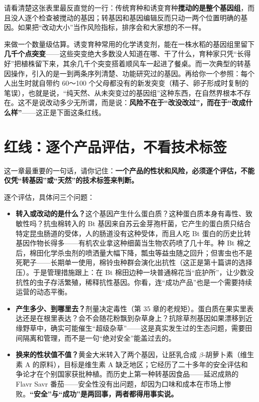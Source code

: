 请看清楚这张表里最反直觉的一行：传统育种和诱变育种\textbf{搅动的是整个基因组}，而且没人逐个检查被搅动的基因；转基因和基因编辑反而只动一两个位置明确的基因。如果把“改动大小”当作风险指标，排序会和大家想的不一样。

\begin{qiaoliang}
来做一个数量级估算。诱变育种常用的化学诱变剂，能在一株水稻的基因组里留下\textbf{几千个点突变}——这些突变绝大多数没人知道在哪、干了什么，育种家只凭“长得好”把植株留下来，其余几千个突变搭着顺风车一起进了餐桌。而一次典型的转基因操作，引入的是一到两条序列清楚、功能研究过的基因。再给你一个参照：每个人出生时就自带约 60～100 个父母都没有的新发突变（精子、卵子形成时复制的笔误），也就是说，“纯天然、从未突变过的基因组”这种东西，在自然界根本不存在。这不是说改动多少无所谓，而是说：\textbf{风险不在于“改没改过”，而在于“改成什么样”}——这正是下面这条红线。
\end{qiaoliang}

\section{红线：逐个产品评估，不看技术标签}

这一章最重要的一句话，请你记住：\textbf{一个产品的性状和风险，必须逐个评估，不能仅凭“转基因”或“天然”的技术标签来判断。}

逐个评估，具体问三个问题：

\begin{itemize}[itemsep=2pt]
\item \textbf{转入或改动的是什么？}这个基因产生什么蛋白质？这种蛋白质本身有毒性、致敏性吗？抗虫棉转入的 Bt 基因来自苏云金芽孢杆菌，它产生的蛋白质只结合特定昆虫肠道的受体，人的肠道没有这种受体，而且人吃 Bt 蛋白的历史比转基因作物长得多——有机农业拿这种细菌当生物农药喷了几十年。种 Bt 棉之后，棉田化学杀虫剂的喷洒量大幅下降，瓢虫等益虫随之回升；但害虫也不是死靶子——长期单一使用，棉铃虫种群会演化出抗性（这正是第十篇讲的选择压）。于是管理措施跟上：在 Bt 棉田边种一块普通棉花当“庇护所”，让少数没抗性的虫子存活繁殖，稀释抗性基因。你看，连“成功产品”也是一个需要持续运营的动态平衡。
\item \textbf{产生多少、到哪里去？}剂量决定毒性（第 35 章的老规矩）。蛋白质在果实里表达还是在根里表达？会不会随花粉飘到杂草身上？抗除草剂基因如果漂移到近缘野草中，确实可能催生“超级杂草”——这是真实发生过的生态问题，需要田间隔离和管理，而不是一句“绝对安全”能盖过去的。
\item \textbf{换来的性状值不值？}黄金大米转入了两个基因，让胚乳合成 $\beta$-胡萝卜素（维生素 A 的原料），目标是维生素 A 缺乏地区；它经历了二十多年的安全评估和争论才在个别国家获批种植。而历史上第一种转基因食品——延迟成熟的 Flavr Savr 番茄——安全性没有出问题，却因为口味和成本在市场上惨败。\textbf{“安全”与“成功”是两回事，两者都得用事实说。}
\end{itemize}

